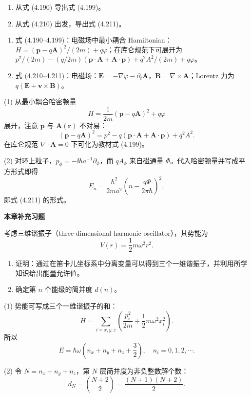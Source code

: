 \begin{question}
\begin{enumerate}
\item 从式 (4.190) 导出式 (4.199)。
\item 从式 (4.210) 出发，导出式 (4.211)。
\end{enumerate}

\par\smallskip
{}
\begin{enumerate}[leftmargin=2.2em,itemsep=0.12em,topsep=0.12em,parsep=0pt]
\item 式 (4.190--4.199)：电磁场中最小耦合 Hamiltonian：$H=(\mathbf p-q\mathbf A)^2/(2m)+q\varphi$；在库仑规范下可展开为 $p^2/(2m)-(q/2m)(\mathbf p\cdot\mathbf A+\mathbf A\cdot\mathbf p)+q^2A^2/(2m)+q\varphi$。
\item 式 (4.210--4.211)：电磁场：$\mathbf E=-\nabla\varphi-\partial_t\mathbf A$，$\mathbf B=\nabla\times\mathbf A$；Lorentz 力为 $q(\mathbf E+\mathbf v\times\mathbf B)$。
\end{enumerate}

\end{question}
\begin{solution}

(1) 从最小耦合哈密顿量
\[
H=\frac{1}{2m}(\mathbf p-q\mathbf A)^2+q\varphi
\]
展开，注意 $\mathbf p$ 与 $\mathbf A(\mathbf r)$ 不对易：
\[
(\mathbf p-q\mathbf A)^2=p^2-q(\mathbf p\cdot\mathbf A+
\mathbf A\cdot\mathbf p)+q^2A^2.
\]
在库仑规范 $\nabla\cdot\mathbf A=0$ 下可化为教材式 (4.199)。

(2) 对环上粒子，$p_\phi=-\ii\hbar a^{-1}\partial_\phi$，而 $qA_\phi$ 来自磁通量 $\Phi$。代入哈密顿量并写成平方形式即得
\[
E_n=\frac{\hbar^2}{2ma^2}\left(n-\frac{q\Phi}{2\pi\hbar}\right)^2,
\]
即式 (4.211) 的形式。

\end{solution}

\begin{center}\Large\bfseries 本章补充习题\end{center}

\begin{question}
考虑三维谐振子（three-dimensional harmonic oscillator），其势能为
\[
V(r)=\frac12m\omega^2r^2.
\]
\begin{enumerate}
\item 证明：通过在笛卡儿坐标系中分离变量可以得到三个一维谐振子，并利用所学知识给出能量允许值。
\item 确定第 $n$ 个能级的简并度 $d(n)$。
\end{enumerate}
\end{question}
\begin{solution}

(1) 势能可写成三个一维谐振子的和：
\[
H=\sum_{i=x,y,z}\left(\frac{p_i^2}{2m}+\frac12m\omega^2x_i^2\right).
\]
所以
\[
E=\hbar\omega\left(n_x+n_y+n_z+\frac32\right),
\quad n_i=0,1,2,\cdots.
\]

(2) 令 $N=n_x+n_y+n_z$，第 $N$ 层简并度为非负整数解个数：
\[
d_N=\binom{N+2}{2}=\frac{(N+1)(N+2)}{2}.
\]

\end{solution}

